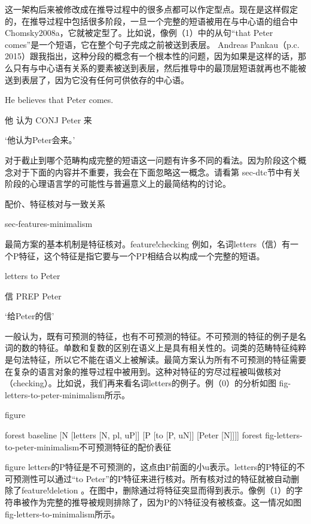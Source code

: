 这一架构后来被修改成在推导过程中的很多点都可以作定型点。现在是这样假定的，在推导过程中包括很多阶段，一旦一个完整的短语被用在与中心语的组合中 Chomsky2008a，它就被定型了。比如说，像例（1）中的从句“that Peter comes”是一个短语，它在整个句子完成之前被送到表层。 
Andreas Pankau（p.c. 2015）跟我指出，这种分段的概念有一个根本性的问题，因为如果是这样的话，那么只有与中心语有关系的要素被送到表层，然后推导中的最顶层短语就再也不能被送到表层了，因为它没有任何可供依存的中心语。











He believes that Peter comes.

他 认为 CONJ Peter 来

`他认为Peter会来。'

对于截止到哪个范畴构成完整的短语这一问题有许多不同的看法。因为阶段这个概念对于下面的内容并不重要，我会在下面忽略这一概念。请看第 sec-dtc节中有关阶段的心理语言学的可能性与普遍意义上的最简结构的讨论。




配价、特征核对与一致关系

sec-features-minimalism

最简方案的基本机制是特征核对。feature!checking 例如，名词letters（信）有一个P特征，这个特征是指它要与一个PP相结合以构成一个完整的短语。



letters to Peter

信 PREP Peter

`给Peter的信'

一般认为，既有可预测的特征，也有不可预测的特征。不可预测的特征的例子是名词的数的特征。单数和复数的区别在语义上是具有相关性的。词类的范畴特征纯粹是句法特征，所以它不能在语义上被解读。最简方案认为所有不可预测的特征需要在复杂的语言对象的推导过程中被用到。这种对特征的穷尽过程被叫做核对（checking）。比如说，我们再来看名词letters的例子。例（0）的分析如图 fig-letters-to-peter-minimalism所示。







figure

forest
baseline
[N 
  [letters [N, pl, uP]]
  [P
    [to [P, uN]]
    [Peter [N]]]]
forest
fig-letters-to-peter-minimalism不可预测特征的配价表征

figure
letters的P特征是不可预测的，这点由P前面的小u表示。letters的P特征的不可预测性可以通过“to Peter”的P特征来进行核对。所有核对过的特征就被自动删除了feature!deletion 。在图中，删除通过将特征突显而得到表示。像例（1）的字符串被作为完整的推导被规则排除了，因为P的N特征没有被核查。这一情况如图 fig-letters-to-minimalism所示。





